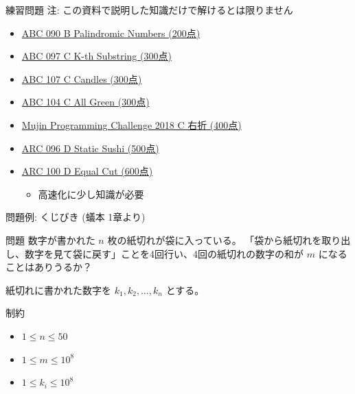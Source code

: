 \documentclass[dvipdfmx]{beamer}
\begin{document}
\begin{frame}{練習問題}
  注: この資料で説明した知識だけで解けるとは限りません
  \begin{itemize}
    \item \href{https://beta.atcoder.jp/contests/abc090/tasks/abc090_b}{ABC 090 B Palindromic Numbers (200点)}
    \item \href{https://beta.atcoder.jp/contests/abc097/tasks/arc097_a}{ABC 097 C K-th Substring (300点)}
    \item \href{https://beta.atcoder.jp/contests/abc107/tasks/arc101_a}{ABC 107 C Candles (300点)}
    \item \href{https://beta.atcoder.jp/contests/abc104/tasks/abc104_c}{ABC 104 C All Green (300点)}
    \item \href{https://beta.atcoder.jp/contests/mujin-pc-2018/tasks/mujin_pc_2018_c}{Mujin Programming Challenge 2018 C 右折 (400点)}
    \item \href{https://beta.atcoder.jp/contests/arc096/tasks/arc096_b}{ARC 096 D Static Sushi (500点)}
    \item \href{https://beta.atcoder.jp/contests/arc100/tasks/arc100_b}{ARC 100 D Equal Cut (600点)}
    \begin{itemize}
      \item 高速化に少し知識が必要
    \end{itemize}
  \end{itemize}
\end{frame}

\begin{frame}{問題例: くじびき (蟻本 1章より)}
  \begin{block}{問題}
    数字が書かれた $n$ 枚の紙切れが袋に入っている。
    「袋から紙切れを取り出し、数字を見て袋に戻す」ことを4回行い、4回の紙切れの数字の和が $m$ になることはありうるか？

    紙切れに書かれた数字を $k_1, k_2, \ldots, k_n$ とする。
  \end{block}
  \begin{block}{制約}
    \begin{itemize}
      \item $1 \le n \le 50$
      \item $1 \le m \le 10^8$
      \item $1 \le k_i \le 10^8$
    \end{itemize}
  \end{block}
\end{frame}
\end{document}
